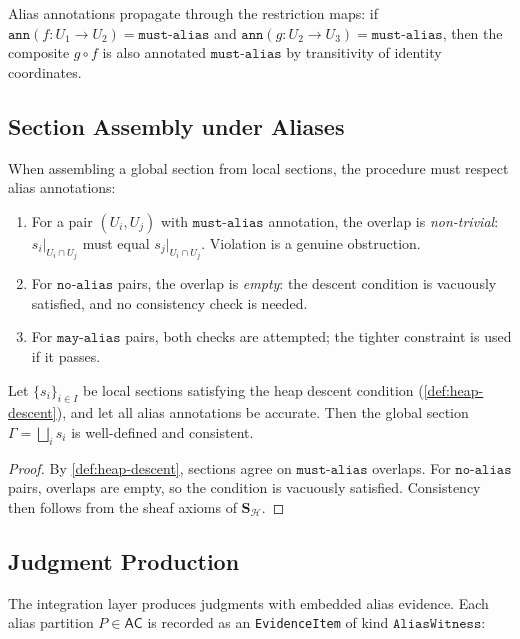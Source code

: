 \documentclass[11pt]{article}
\newcommand{\Heap}{\mathcal{H}}             %
\newcommand{\AliasCls}{\mathsf{AC}}         %
\newcommand{\MayAlias}{\ensuremath{\mathtt{may\text{-}alias}}}  %
\newcommand{\MustAlias}{\ensuremath{\mathtt{must\text{-}alias}}} %
\newcommand{\NoAlias}{\ensuremath{\mathtt{no\text{-}alias}}}     %
\newcommand{\SHeap}{\mathbf{S}_{\Heap}}    %
\newcommand{\GlobSec}{\Gamma}               %
\begin{document}
Alias annotations propagate through the restriction maps: if
$\mathtt{ann}(f : U_1 \to U_2) = \MustAlias$ and
$\mathtt{ann}(g : U_2 \to U_3) = \MustAlias$, then the composite
$g \circ f$ is also annotated $\MustAlias$ by transitivity of identity
coordinates.

\subsection{Section Assembly under Aliases}

When assembling a global section from local sections, the \GLUE{}
procedure must respect alias annotations:

\begin{enumerate}[noitemsep]
  \item For a pair $(U_i, U_j)$ with $\MustAlias$ annotation, the
    overlap is \emph{non-trivial}: $s_i|_{U_i \cap U_j}$ must equal
    $s_j|_{U_i \cap U_j}$.  Violation is a genuine obstruction.
  \item For $\NoAlias$ pairs, the overlap is \emph{empty}: the descent
    condition is vacuously satisfied, and no consistency check is
    needed.
  \item For $\MayAlias$ pairs, both checks are attempted; the tighter
    constraint is used if it passes.
\end{enumerate}

\begin{proposition}
  \label{prop:alias-gluing}
  Let $\{s_i\}_{i \in I}$ be local sections satisfying the heap descent
  condition (\cref{def:heap-descent}), and let all alias annotations be
  accurate.  Then the global section $\GlobSec = \bigsqcup_i s_i$ is
  well-defined and consistent.
\end{proposition}
\begin{proof}
  By \cref{def:heap-descent}, sections agree on $\MustAlias$ overlaps.
  For $\NoAlias$ pairs, overlaps are empty, so the condition is
  vacuously satisfied.  Consistency then follows from the sheaf axioms
  of $\SHeap$.
\end{proof}

\subsection{Judgment Production}

The integration layer produces \JuGeo{} judgments with embedded alias
evidence.  Each alias partition $P \in \AliasCls$ is recorded as an
\texttt{EvidenceItem} of kind $\mathtt{AliasWitness}$:
\end{document}
